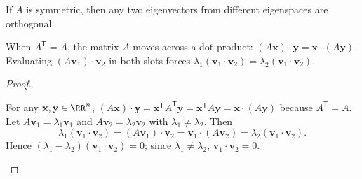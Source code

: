 \documentclass[10pt]{scrartcl}
\newcommand{\vv}[1]{\mathbf{#1}}
\begin{document}
\begin{theorem*}
  If $A$ is symmetric, then any two eigenvectors from different eigenspaces are orthogonal.
\end{theorem*}
\begin{ideabox}
  When $A^{\mathsf T}=A$, the matrix $A$ moves across a dot product: $(A\vv x)\cdot\vv y = \vv x\cdot(A\vv y)$. Evaluating $(A\vv v_1)\cdot\vv v_2$ in both slots forces $\lambda_1(\vv v_1\cdot\vv v_2)=\lambda_2(\vv v_1\cdot\vv v_2)$.
\end{ideabox}
\begin{proof}
  \begin{steps}
    \ii For any $\vv x,\vv y\in\RR^n$, $(A\vv x)\cdot\vv y = \vv x^{\mathsf T}A^{\mathsf T}\vv y = \vv x^{\mathsf T}A\vv y = \vv x\cdot(A\vv y)$ because $A^{\mathsf T}=A$.
    \ii Let $A\vv v_1=\lambda_1\vv v_1$ and $A\vv v_2=\lambda_2\vv v_2$ with $\lambda_1\neq\lambda_2$. Then
    \[
      \lambda_1(\vv v_1\cdot\vv v_2) = (A\vv v_1)\cdot\vv v_2 = \vv v_1\cdot(A\vv v_2) = \lambda_2(\vv v_1\cdot\vv v_2).
    \]
    \ii Hence $(\lambda_1-\lambda_2)(\vv v_1\cdot\vv v_2)=0$; since $\lambda_1\neq\lambda_2$, $\vv v_1\cdot\vv v_2=0$. \qedhere
  \end{steps}
\end{proof}
\end{document}
